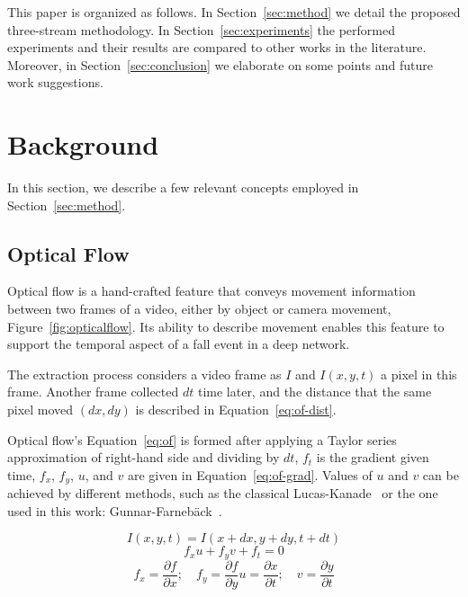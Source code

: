 \documentclass[conference]{IEEEtran}
\begin{document}
This paper is organized as follows. In Section~\ref{sec:method} we detail the proposed three-stream methodology. In Section~\ref{sec:experiments} the performed experiments and their results are compared to other works in the literature. Moreover, in Section~\ref{sec:conclusion} we elaborate on some points and future work suggestions.





\section{Background}
\label{background}

In this section, we describe a few relevant concepts employed in Section~\ref{sec:method}.

\subsection{Optical Flow}
\label{sec:opticalflow}

Optical flow is a hand-crafted feature that conveys movement information between two frames of a video, either by object or camera movement, Figure~\ref{fig:opticalflow}. Its ability to describe movement enables this feature to support the temporal aspect of a fall event in a deep network.

The extraction process considers a video frame as $I$ and $I(x, y, t)$ a pixel in this frame. Another frame collected $dt$ time later, and the distance that the same pixel moved $(dx, dy)$ is described in Equation~\ref{eq:of-dist}.

Optical flow's Equation~\ref{eq:of} is formed after applying a Taylor series approximation of right-hand side and dividing by $dt$, $f_t$ is the gradient given time, $f_x$, $f_y$, $u$, and $v$ are given in Equation~\ref{eq:of-grad}. Values of $u$ and $v$ can be achieved by different methods, such as the classical Lucas-Kanade~\cite{jain2018abnormal} or the one used in this work: Gunnar-Farneb{\"a}ck~\cite{lowhur2015dense}.

\begin{equation}
\label{eq:of-dist}
I(x, y, t)=I(x+dx, y+dy, t+dt)
\end{equation}
\begin{equation}
\label{eq:of}
f_xu + f_yv + f_t=0
\end{equation}
\begin{equation}
\label{eq:of-grad}
f_x = \frac{\partial f}{\partial x}; \quad f_y = \frac{\partial f}{\partial y}u = \frac{\partial x}{\partial t}; \quad v = \frac{\partial y}{\partial t}
\end{equation}
\end{document}
